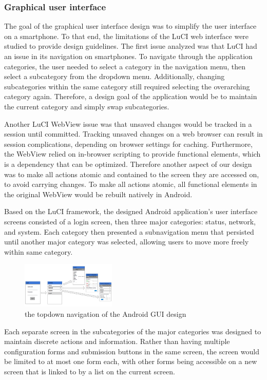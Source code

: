 \subsubsection{Graphical user interface}
The goal of the graphical user interface design was to simplify the user interface on a smartphone. To that end, the limitations of the LuCI web interface were studied to provide design guidelines. The first issue analyzed was that LuCI had an issue in its navigation on smartphones. To navigate through the application categories, the user needed to select a category in the navigation menu, then select a subcategory from the dropdown menu. Additionally, changing subcategories within the same category still required selecting the overarching category again. Therefore, a design goal of the application would be to maintain the current category and simply swap subcategories.
	
Another LuCI WebView issue was that unsaved changes would be tracked in a session until committed. Tracking unsaved changes on a web browser can result in session complications, depending on browser settings for caching. Furthermore, the WebView relied on in-browser scripting to provide functional elements, which is a dependency that can be optimized. Therefore another aspect of our design was to make all actions atomic and contained to the screen they are accessed on, to avoid carrying changes. To make all actions atomic, all functional elements in the original WebView would be rebuilt natively in Android.
	
Based on the LuCI framework, the designed Android application's user interface screens consisted of a login screen, then three major categories: status, network, and system. Each category then presented a subnavigation menu that persisted until another major category was selected, allowing users to move more freely within same category.

	\begin{figure}
		\centering
		\includegraphics[width=0.4\textwidth]{UItopdown.png}
		\caption{the topdown navigation of the Android GUI design}
		\label{OpenWRT:androidtopdown}
	\end{figure}
	
Each separate screen in the subcategories of the major categories was designed to maintain discrete actions and information. Rather than having multiple configuration forms and submission buttons in the same screen, the screen would be limited to at most one form each, with other forms being accessible on a new screen that is linked to by a list on the current screen.

